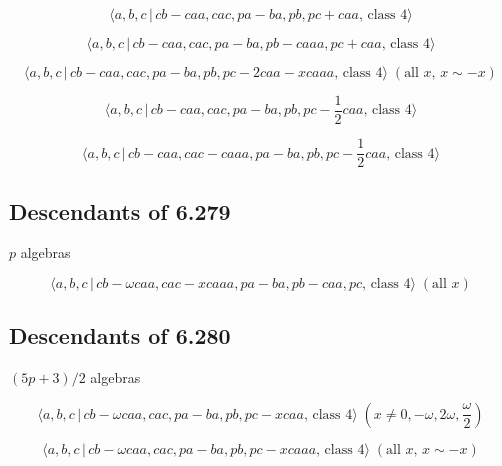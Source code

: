 \documentclass[10pt]{article}
\begin{document}
\begin{equation}
\langle a,b,c\,|\,cb-caa,cac,pa-ba,pb,pc+caa,\,\text{class }4\rangle 
\tag{7.2259}
\end{equation}

\begin{equation}
\langle a,b,c\,|\,cb-caa,cac,pa-ba,pb-caaa,pc+caa,\,\text{class }4\rangle 
\tag{7.2260}
\end{equation}

\begin{equation}
\langle a,b,c\,|\,cb-caa,cac,pa-ba,pb,pc-2caa-xcaaa,\,\text{class }4\rangle
\;(\text{all }x,\,x\sim -x)  \tag{7.2261}
\end{equation}

\begin{equation}
\langle a,b,c\,|\,cb-caa,cac,pa-ba,pb,pc-\frac{1}{2}caa,\,\text{class }%
4\rangle  \tag{7.2262}
\end{equation}

\begin{equation}
\langle a,b,c\,|\,cb-caa,cac-caaa,pa-ba,pb,pc-\frac{1}{2}caa,\,\text{class }%
4\rangle  \tag{7.2263}
\end{equation}

\subsection{Descendants of 6.279}

$p$ algebras

\begin{equation}
\langle a,b,c\,|\,cb-\omega caa,cac-xcaaa,pa-ba,pb-caa,pc,\,\text{class }%
4\rangle \;(\text{all }x)  \tag{7.2264}
\end{equation}

\subsection{Descendants of 6.280}

$(5p+3)/2$ algebras

\begin{equation}
\langle a,b,c\,|\,cb-\omega caa,cac,pa-ba,pb,pc-xcaa,\,\text{class }4\rangle
\;(x\neq 0,-\omega ,2\omega ,\frac{\omega }{2})  \tag{7.2265}
\end{equation}

\begin{equation}
\langle a,b,c\,|\,cb-\omega caa,cac,pa-ba,pb,pc-xcaaa,\,\text{class }%
4\rangle \;(\text{all }x,\,x\sim -x)  \tag{7.2266}
\end{equation}
\end{document}
